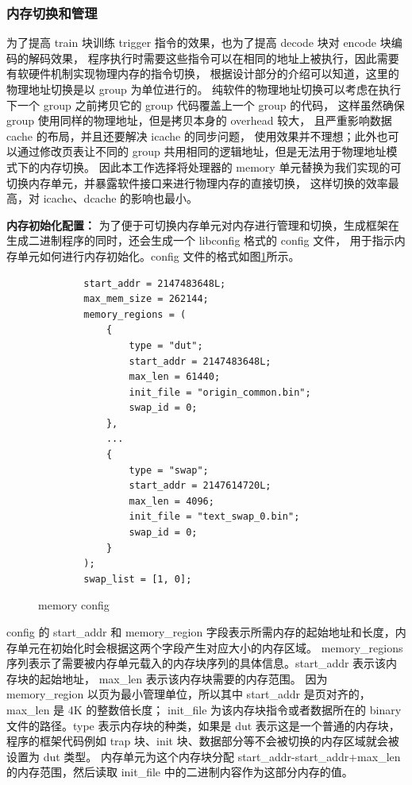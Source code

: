 \subsubsection{内存切换和管理}
为了提高 train 块训练 trigger 指令的效果，也为了提高 decode 块对 encode 块编码的解码效果，
程序执行时需要这些指令可以在相同的地址上被执行，因此需要有软硬件机制实现物理内存的指令切换，
根据设计部分的介绍可以知道，这里的物理地址切换是以 group 为单位进行的。
纯软件的物理地址切换可以考虑在执行下一个 group 之前拷贝它的 group 代码覆盖上一个 group 的代码，
这样虽然确保 group 使用同样的物理地址，但是拷贝本身的 overhead 较大，
且严重影响数据 cache 的布局，并且还要解决 icache 的同步问题，
使用效果并不理想；此外也可以通过修改页表让不同的 group 共用相同的逻辑地址，但是无法用于物理地址模式下的内存切换。
因此本工作选择将处理器的 memory 单元替换为我们实现的可切换内存单元，并暴露软件接口来进行物理内存的直接切换，
这样切换的效率最高，对 icache、dcache 的影响也最小。\par

\textbf{内存初始化配置：}
为了便于可切换内存单元对内存进行管理和切换，生成框架在生成二进制程序的同时，还会生成一个 libconfig 格式的 config 文件，
用于指示内存单元如何进行内存初始化。config 文件的格式如图\ref{code:memory-config}所示。\par

\begin{figure}[htbp]
    \centering
    \begin{verbatim}
        start_addr = 2147483648L;
        max_mem_size = 262144;
        memory_regions = (
            {
                type = "dut";
                start_addr = 2147483648L;
                max_len = 61440;
                init_file = "origin_common.bin";
                swap_id = 0;
            },
            ...
            {
                type = "swap";
                start_addr = 2147614720L;
                max_len = 4096;
                init_file = "text_swap_0.bin";
                swap_id = 0;
            }
        );
        swap_list = [1, 0];
    \end{verbatim}
    \caption{memory config}
    \label{code:memory-config}
\end{figure}

config 的 start\_addr 和 memory\_region 字段表示所需内存的起始地址和长度，内存单元在初始化时会根据这两个字段产生对应大小的内存区域。
memory\_regions 序列表示了需要被内存单元载入的内存块序列的具体信息。start\_addr 表示该内存块的起始地址，
max\_len 表示该内存块需要的内存范围。
因为 memory\_region 以页为最小管理单位，所以其中 start\_addr 是页对齐的，max\_len 是 4K 的整数倍长度；
init\_file 为该内存块指令或者数据所在的 binary 文件的路径。type 表示内存块的种类，如果是 dut 表示这是一个普通的内存块，
程序的框架代码例如 trap 块、init 块、数据部分等不会被切换的内存区域就会被设置为 dut 类型。
内存单元为这个内存块分配 start\_addr-start\_addr+max\_len 的内存范围，然后读取 init\_file 中的二进制内容作为这部分内存的值。\par

